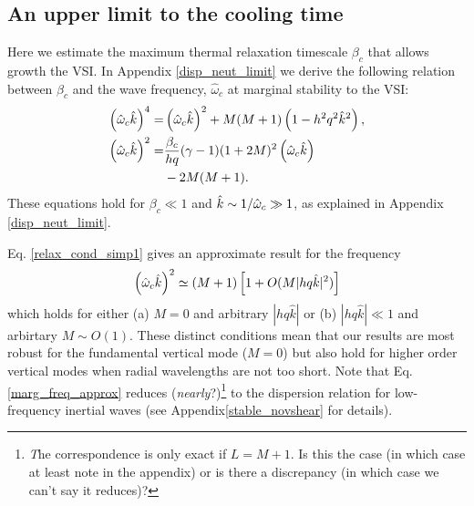 \subsection{An upper limit to the cooling time}\label{iso_vsi_beta_crit}
Here we estimate the maximum thermal relaxation timescale 
$\beta_c$ that allows growth the VSI.  In Appendix \ref{disp_neut_limit}
we derive the following relation between $\beta_c$ and the wave frequency,
$\hat{\omega}_c$  at marginal stability to the VSI:
\begin{subequations}\begin{align}
 \left(\hat{\omega}_c\hat{k}\right)^4  = &  
 \left(\hat{\omega}_c\hat{k}\right)^2  + M(M+1)\left(1-h^2q^2\hat{k}^2\right) , \label{relax_cond_simp1} \\
   \left(\hat{\omega}_c\hat{k}\right)^2 = & \frac{\beta_c}{h q} (\gamma-1)(1+2M)^2
   \left(\hat{\omega}_c\hat{k}\right) \label{relax_cond_simp2}\\
   &- 2M(M+1) . \notag
\end{align}\end{subequations}
These equations hold for $\beta_c \ll 1$ and $\hat{k} \sim 1/\hat{\omega}_c \gg1$,
as explained in Appendix \ref{disp_neut_limit}.

Eq. \ref{relax_cond_simp1} gives an approximate result for the frequency
\begin{align}
 \left(\hat{\omega}_c\hat{k}\right)^2 \simeq (M+1)\left[1  + O( M|h q \hat{k}|^2)\right]  \label{marg_freq_approx}
\end{align}
which holds for either (a) $M= 0$ and arbitrary $|h q \hat{k}|$ or (b) $|h q \hat{k}| \ll 1$ and arbirtary $M \sim O(1)$. 
These distinct conditions mean that our results are most robust for the fundamental vertical mode ($M = 0$) but also
hold for higher order vertical modes when radial wavelengths are not too short.
Note that Eq. \ref{marg_freq_approx} 
reduces (\emph{nearly}?)\footnote{\emph The correspondence is only exact 
if $L = M+1$.  Is this the case (in which case at least note in the appendix) or is there a discrepancy (in which case 
we can't say it reduces)?}
 to the dispersion relation for low-frequency inertial waves 
(see Appendix\ref{stable_novshear} for details).

